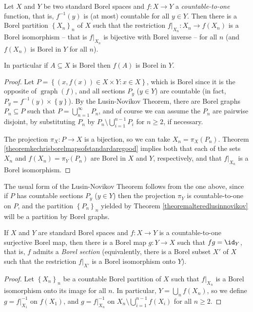 \begin{theorem}\label{theoremalteredlusinnovikov}
Let $X$ and $Y$ be two standard Borel spaces and $f:X\to Y$ a \emph{countable-to-one} function, that is, $f^{-1}(y)$ is (at most) countable for all $y\in Y$. Then there is a Borel partition $\left\{X_n\right\}_n$ of $X$ such that the restriction $f|_{X_n}:X_n\to f(X_n)$ is a Borel isomorphism -- that is $f|_{X_n}$ is bijective with Borel inverse -- for all $n$ (and $f(X_n)$ is Borel in $Y$ for all $n$).

In particular if $A\subseteq X$ is Borel then $f(A)$ is Borel in $Y$.
\end{theorem}
\begin{proof}
Let $P=\left\{(x,f(x))\in X\times Y:x\in X\right\}$, which is Borel since it is the opposite of $\operatorname{graph}(f)$, and all sections $P_y$ ($y\in Y$) are countable (in fact, $P_y=f^{-1}(y)\times\left\{y\right\}$). By the Lusin-Novikov Theorem, there are Borel graphs $P_n\subseteq P$ such that $P=\bigcup_{n=1}^\infty P_n$, and of course we can assume the $P_n$ are pairwise disjoint, by substituting $P_n$ by $P_n\setminus\bigcup_{i=1}^{n-1}P_i$ for $n\geq 2$, if necessary.

The projection $\pi_X:P\to X$ is a bijection, so we can take $X_n=\pi_X(P_n)$. Theorem \ref{theoremkechrisborelmapsofstandardaregood} implies both that each of the sets $X_n$ and $f(X_n)=\pi_Y(P_n)$ are Borel in $X$ and $Y$, respectively, and that $f|_{X_n}$ is a Borel isomorphism.\qedhere
\end{proof}

\begin{remark}
The usual form of the Lusin-Novikov Theorem follows from the one above, since if $P$ has countable sections $P_y$ ($y\in Y$) then the projection $\pi_Y$ is countable-to-one on $P$, and the partition $\left\{P_n\right\}_n$ yielded by Theorem \ref{theoremalteredlusinnovikov} will be a partition by Borel graphs.
\end{remark}

\begin{corollary}\label{corollarysurjectiveborelmapshavesections}
If $X$ and $Y$ are standard Borel spaces and $f:X\to Y$ is a countable-to-one surjective Borel map, then there is a Borel map $g:Y\to X$ such that $fg=\id_Y$, that is, $f$ admits a \emph{Borel section} (equivalently, there is a Borel subset $X'$ of $X$ such that the restriction $f|_{X'}$ is a Borel isomorphism onto $Y$).
\end{corollary}
\begin{proof}
Let $\left\{X_n\right\}_n$ be a countable Borel partition of $X$ such that $f|_{X_n}$ is a Borel isomorphism onto its image for all $n$. In particular, $Y=\bigcup_n f(X_n)$, so we define $g=f|_{X_1}^{-1}$ on $f(X_1)$, and $g=f|_{X_n}^{-1}$ on $X_n\setminus\bigcup_{i=1}^{n-1} f(X_i)$ for all $n\geq 2$.\qedhere
\end{proof}

